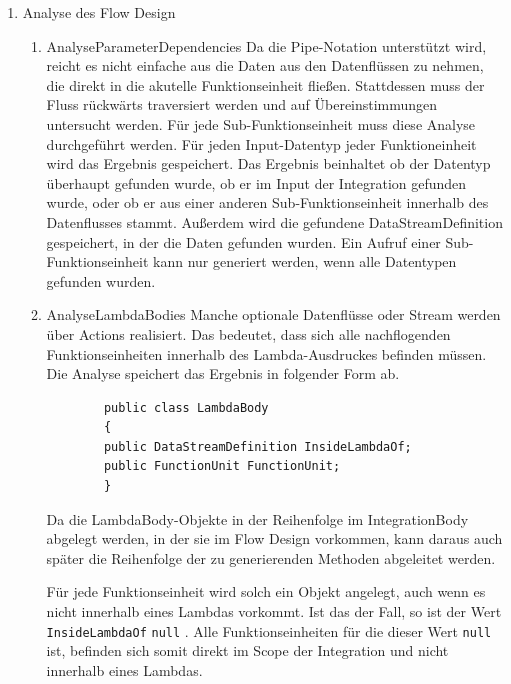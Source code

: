 \begin{enumerate}
	\item Analyse des Flow Design
	\label{sec:orgheadline49}
	\begin{enumerate}
		\item AnalyseParameterDependencies
		\label{sec:orgheadline46}
		Da die Pipe-Notation unterstützt wird, reicht es nicht einfache aus die Daten
		aus den Datenflüssen zu nehmen, die direkt in die akutelle
		Funktionseinheit fließen. Stattdessen muss der Fluss rückwärts
		traversiert werden und auf Übereinstimmungen untersucht werden.
		Für jede Sub-Funktionseinheit muss diese Analyse durchgeführt werden.
		Für jeden Input-Datentyp jeder Funktioneinheit wird das Ergebnis gespeichert. Das Ergebnis beinhaltet ob der Datentyp überhaupt gefunden
		wurde, ob er im Input der Integration gefunden wurde, oder ob er aus einer
		anderen Sub-Funktionseinheit innerhalb des Datenflusses stammt. 
		Außerdem wird die gefundene DataStreamDefinition gespeichert, in der die
		Daten gefunden wurden. Ein Aufruf einer Sub-Funktionseinheit kann nur generiert werden, wenn alle Datentypen gefunden
		wurden.
		
		\item AnalyseLambdaBodies
		\label{sec:orgheadline47}
		Manche optionale Datenflüsse oder Stream werden über Actions realisiert.
		Das bedeutet, dass sich alle nachflogenden Funktionseinheiten innerhalb
		des Lambda-Ausdruckes befinden müssen. Die Analyse speichert das Ergebnis
		in folgender Form ab. 
		
		\begin{verbatim}
		public class LambdaBody
		{
		public DataStreamDefinition InsideLambdaOf;
		public FunctionUnit FunctionUnit;
		}
		\end{verbatim}
		
		Da die LambdaBody-Objekte in der Reihenfolge im IntegrationBody abgelegt
		werden, in der sie im Flow Design vorkommen, kann daraus auch später die
		Reihenfolge der zu generierenden Methoden abgeleitet werden.
		
		
		Für jede Funktionseinheit wird solch ein Objekt angelegt, auch wenn es
		nicht innerhalb eines Lambdas vorkommt. Ist das der Fall, so ist der Wert
		\texttt{InsideLambdaOf} \texttt{null} . Alle Funktionseinheiten für die dieser Wert
		\texttt{null} ist, befinden sich somit direkt im Scope der Integration und nicht
		innerhalb eines Lambdas.
		

\end{enumerate}
\end{enumerate}
